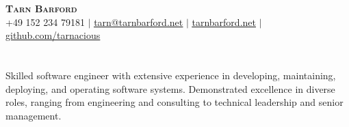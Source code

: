 \documentclass[letterpaper,11pt]{article}
\begin{document}
\begin{center}
    \textbf{\Huge \scshape Tarn Barford} \\ \vspace{1pt}
    \small +49 152 234 79181 $|$
    \href{mailto:tarn@tarnbarford.net}{\uline{tarn@tarnbarford.net}} $|$
    \href{https://tarnbarford.net}{\uline{tarnbarford.net}} $|$
    \href{https://github.com/tarnacious}{\uline{github.com/tarnacious}}
\end{center}

\section*{}
  \small { Skilled software engineer with extensive experience in developing, maintaining, deploying, and operating software systems. Demonstrated excellence in diverse roles, ranging from engineering and consulting to technical leadership and senior management. }
\end{document}
